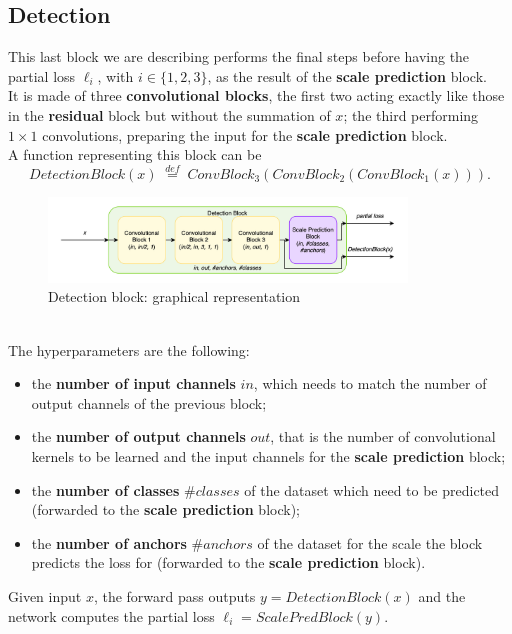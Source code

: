 \documentclass[../report.tex]{subfiles}
\begin{document}
\subsection{Detection}\label{ss:network-blocks-detection}
This last block we are describing performs the final steps before having the partial loss $\ell_i$, with $i \in{} {\{1,2,3\}}$, as the result of the \textbf{scale prediction} block.\\
It is made of three \textbf{convolutional blocks}, the first two acting exactly like those in the \textbf{residual} block but without the summation of $x$; the third performing $1\times{}1$ convolutions, preparing the input for the \textbf{scale prediction} block.\\
A function representing this block can be
$$DetectionBlock(x) \; \stackrel{def}{=} \; ConvBlock_3(ConvBlock_2(ConvBlock_1(x))).$$
\begin{figure}[h]
    \centering
    \includegraphics[width=0.85\textwidth]{assets/images/detection_block}
    \caption{Detection block: graphical representation}\label{img:detection_block}
\end{figure}\\
The hyperparameters are the following:
\begin{itemize}
    \item the \textbf{number of input channels} $in$, which needs to match the number of output channels of the previous block;
    \item the \textbf{number of output channels} $out$, that is the number of convolutional kernels to be learned and the input channels for the \textbf{scale prediction} block;
    \item the \textbf{number of classes} $\#classes$ of the dataset which need to be predicted (forwarded to the \textbf{scale prediction} block);
    \item the \textbf{number of anchors} $\#anchors$ of the dataset for the scale the block predicts the loss for (forwarded to the \textbf{scale prediction} block).
\end{itemize}
Given input $x$, the forward pass outputs $y = DetectionBlock(x)$ and the network computes the partial loss $\ell_i = ScalePredBlock(y)$.
\end{document}
